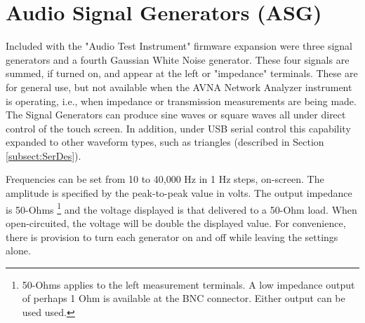 \section{Audio Signal Generators (ASG)}
\label{sect:ASG}
Included with the "Audio Test Instrument" firmware expansion were three signal generators and a fourth Gaussian White Noise generator. These four signals are summed, if turned on, and appear at the left or "impedance" terminals.  These are for general use, but not available when the AVNA Network Analyzer instrument is operating, i.e., when impedance or transmission measurements are being made.  The Signal Generators can produce sine waves or square waves all under direct control of the touch screen.  In addition, under USB serial control this capability  expanded to other waveform types, such as triangles (described in Section \ref{subsect:SerDes}).

Frequencies can be set from 10 to 40,000 Hz in 1 Hz steps, on-screen.  The amplitude is specified by the peak-to-peak value in volts.  The output impedance is 50-Ohms
%
\footnote{50-Ohms applies to the left measurement terminals.  A low impedance output of perhaps 1 Ohm is available at the BNC connector.  Either output can be used used.  }
%
 and the voltage displayed is that delivered to a 50-Ohm load. When open-circuited, the voltage will be double the displayed value.  For convenience, there is provision to turn each generator on and off while leaving the settings alone.


